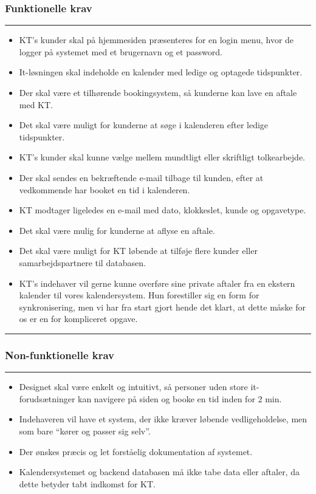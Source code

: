 \documentclass[12pt]{article}   %
\begin{document}
\subsubsection{Funktionelle krav}

\rule{120mm}{1mm}
\begin{itemize}
\item KT's kunder skal på hjemmesiden præsenteres for en login menu, hvor de logger på systemet med et brugernavn og et password.
\item It-løsningen skal indeholde en kalender med ledige og optagede tidspunkter.
\item Der skal være et tilhørende bookingsystem, så kunderne kan lave en aftale med KT.  
\item Det skal være muligt for kunderne at søge i kalenderen efter ledige tidspunkter.
\item KT's kunder skal kunne vælge mellem mundtligt eller skriftligt tolkearbejde.
\item Der skal sendes en bekræftende e-mail tilbage til kunden, efter at vedkommende har booket en tid i kalenderen. 
\item KT modtager ligeledes en e-mail med dato, klokkeslet, kunde og opgavetype.
\item Det skal være mulig for kunderne at aflyse en aftale.
\item Det skal være muligt for KT løbende at tilføje flere kunder eller samarbejdspartnere til databasen. 
\item KT's indehaver vil gerne kunne overføre sine private aftaler fra en ekstern kalender til vores kalendersystem. Hun forestiller sig en form for synkronisering, men vi har fra start gjort hende det klart, at dette måske for os er en for kompliceret opgave. 
\end{itemize}
\rule{120mm}{1mm}
\vspace{0.5cm}

\subsubsection{Non-funktionelle krav}

\rule{120mm}{1mm}
\begin{itemize}
\item Designet skal være enkelt	og intuitivt, så personer uden store it-forudsætninger kan navigere på siden og booke en tid inden for 2 min.
\item Indehaveren vil have et system, der ikke kræver løbende	vedligeholdelse, men som bare ``kører og passer sig selv''.   
\item Der ønskes præcis og let forståelig dokumentation af systemet. 
\item Kalendersystemet og backend databasen må ikke tabe data eller aftaler, da dette betyder tabt indkomst for KT.
\end{itemize}
\end{document}
